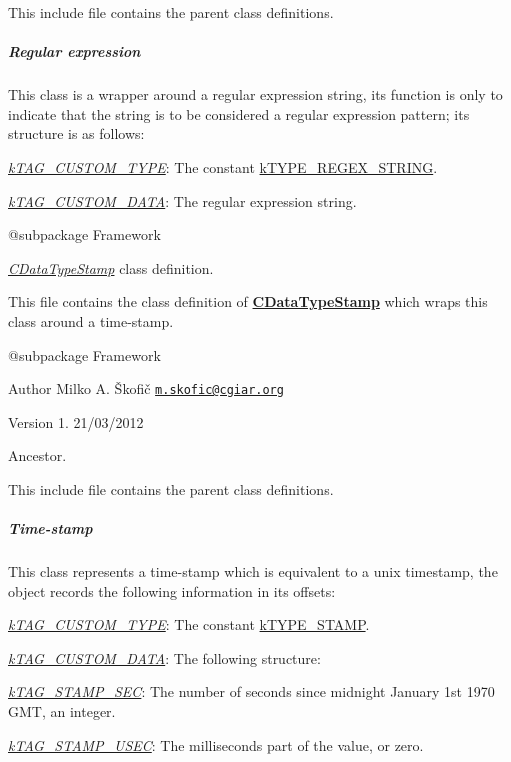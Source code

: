 This include file contains the parent class definitions. \subparagraph*{Regular expression}

This class is a wrapper around a regular expression string, its function is only to indicate that the string is to be considered a regular expression pattern; its structure is as follows\-:


\begin{DoxyItemize}
\item {\itshape \hyperlink{}{k\-T\-A\-G\-\_\-\-C\-U\-S\-T\-O\-M\-\_\-\-T\-Y\-P\-E}}\-: The constant \hyperlink{}{k\-T\-Y\-P\-E\-\_\-\-R\-E\-G\-E\-X\-\_\-\-S\-T\-R\-I\-N\-G}. 
\item {\itshape \hyperlink{}{k\-T\-A\-G\-\_\-\-C\-U\-S\-T\-O\-M\-\_\-\-D\-A\-T\-A}}\-: The regular expression string. 
\end{DoxyItemize}

\begin{DoxyVerb} @subpackage        Framework\end{DoxyVerb}


{\itshape \hyperlink{class_c_data_type_stamp}{C\-Data\-Type\-Stamp}} class definition.

This file contains the class definition of {\bfseries \hyperlink{class_c_data_type_stamp}{C\-Data\-Type\-Stamp}} which wraps this class around a time-\/stamp.

\begin{DoxyVerb} @subpackage        Framework
\end{DoxyVerb}


\begin{DoxyAuthor}{Author}
Milko A. Škofič \href{mailto:m.skofic@cgiar.org}{\tt m.\-skofic@cgiar.\-org} 
\end{DoxyAuthor}
\begin{DoxyVersion}{Version}
1. 21/03/2012
\end{DoxyVersion}
Ancestor.

This include file contains the parent class definitions. \subparagraph*{Time-\/stamp}

This class represents a time-\/stamp which is equivalent to a unix timestamp, the object records the following information in its offsets\-:


\begin{DoxyItemize}
\item {\itshape \hyperlink{}{k\-T\-A\-G\-\_\-\-C\-U\-S\-T\-O\-M\-\_\-\-T\-Y\-P\-E}}\-: The constant \hyperlink{}{k\-T\-Y\-P\-E\-\_\-\-S\-T\-A\-M\-P}. 
\item {\itshape \hyperlink{}{k\-T\-A\-G\-\_\-\-C\-U\-S\-T\-O\-M\-\_\-\-D\-A\-T\-A}}\-: The following structure\-: 
\begin{DoxyItemize}
\item {\itshape \hyperlink{}{k\-T\-A\-G\-\_\-\-S\-T\-A\-M\-P\-\_\-\-S\-E\-C}}\-: The number of seconds since midnight January 1st 1970 G\-M\-T, an integer. 
\item {\itshape \hyperlink{}{k\-T\-A\-G\-\_\-\-S\-T\-A\-M\-P\-\_\-\-U\-S\-E\-C}}\-: The milliseconds part of the value, or zero. 
\end{DoxyItemize}
\end{DoxyItemize}

